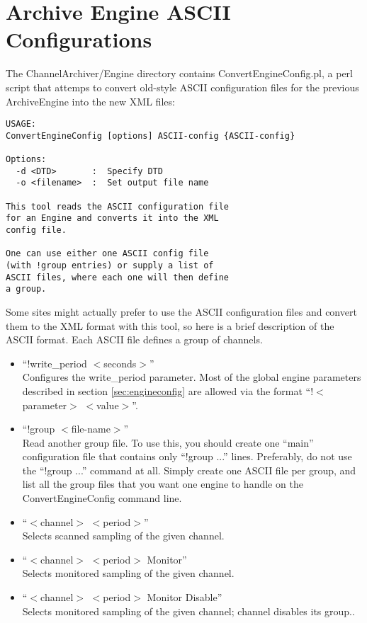\section{Archive Engine ASCII Configurations} \label{sec:ASCIIConfig}
The ChannelArchiver/Engine directory contains ConvertEngineConfig.pl,
a perl script that attemps to convert old-style ASCII configuration
files for the previous ArchiveEngine into the new XML files:
\begin{lstlisting}[keywordstyle=\sffamily]
USAGE:
ConvertEngineConfig [options] ASCII-config {ASCII-config}
 
Options:
  -d <DTD>       :  Specify DTD
  -o <filename>  :  Set output file name
 
This tool reads the ASCII configuration file
for an Engine and converts it into the XML
config file.
 
One can use either one ASCII config file
(with !group entries) or supply a list of
ASCII files, where each one will then define
a group.
\end{lstlisting}

\noindent Some sites might actually prefer to use the ASCII
configuration files and convert them to the XML format with this tool,
so here is a brief description of the ASCII format.
Each ASCII file defines a group of channels.
\begin{itemize}
\item ``!write\_period $<$seconds$>$''\\
  Configures the write\_period parameter. Most of the global engine
  parameters described in section \ref{sec:engineconfig} are allowed
  via the format ``!$<$parameter$>$ $<$value$>$''.
\item ``!group $<$file-name$>$''\\
  Read another group file.
  To use this, you should create one ``main'' configuration file
  that contains only ``!group ...'' lines.
  Preferably, do not use the ``!group ...'' command at all.
  Simply create one ASCII file per group, and list all the group files
  that you want one engine to handle on the ConvertEngineConfig
  command line.
\item ``$<$channel$>$ $<$period$>$''\\
  Selects scanned sampling of the given channel.
\item ``$<$channel$>$ $<$period$>$ Monitor''\\
  Selects monitored sampling of the given channel.
\item ``$<$channel$>$ $<$period$>$ Monitor Disable''\\
  Selects monitored sampling of the given channel; channel disables
  its group..
\end{itemize}


